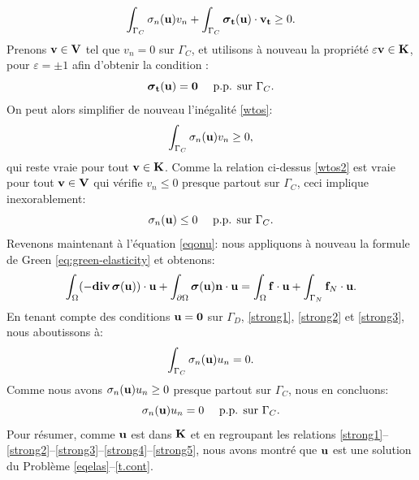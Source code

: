 \documentclass[11pt]{book}
\def\u{{\bf u}}
\def\t{{\bf t}}
\def\n{{\bf n}}
\def\f{{\bf f}}
\def\vv{{\bf v}}
\def\V{{\bf V}}
\def\K{{\bf K}}
\def\0{{\bf 0}}
\newcommand{\dg}{d\Gamma}
\newcommand{\bs}{\mbox{\boldmath{$\sigma$}}}
\begin{document}
 \begin{equation*}
 \int_{\Gamma_C} \sigma_n (\u) v_n %
 +
 \int_{\Gamma_C} \bs_\t (\u) \cdot \vv_\t %
 \geq
 0.
 \end{equation*}
 Prenons $\vv \in \V$ tel que $v_n = 0$ sur $\Gamma_C$, et utilisons à nouveau la propriété $\varepsilon \vv \in \K$, pour $\varepsilon = \pm 1$ %
 afin d'obtenir la condition :
 \begin{equation}\label{strong3}
 \bs_\t(\u) = \0 \quad \textrm{ p.p. sur } \Gamma_C.
 \end{equation}
 On peut alors simplifier de nouveau l'inégalité \eqref{wtos}: %
 \begin{equation}
 \label{wtos2}
 \int_{\Gamma_C} \sigma_n (\u) v_n %
 \geq
 0,
 \end{equation}
qui reste vraie pour tout $\vv \in \K$. 
Comme la relation ci-dessus \eqref{wtos2} est vraie pour tout $\vv \in \V$ qui vérifie $v_n \leq 0$ presque partout sur $\Gamma_C$, ceci implique inexorablement: 
\begin{equation}\label{strong4}
\sigma_n (\u) \leq 0 \quad \textrm{ p.p. sur } \Gamma_C.
\end{equation}
Revenons maintenant à l'équation \eqref{eqonu}:
nous appliquons à nouveau la formule de Green \eqref{eq:green-elasticity} %
et obtenons:
\[
 \displaystyle \int_\Omega (- {\bf div}\, \bs(\u) ) \cdot \u %
 + \int_{\partial \Omega} \bs(\u) \n \cdot \u %
 =
 \displaystyle \int_{\Omega} \f \cdot \u %
 +\int_{\Gamma_N} \f_N \cdot \u. %
\]
En tenant compte des conditions $\u = \0$ sur $\Gamma_D$, \eqref{strong1}, \eqref{strong2} et \eqref{strong3}, nous aboutissons à:
\[
 \int_{\Gamma_C} \sigma_n (\u) u_n %
 = 0.
\]
Comme nous avons $ \sigma_n (\u) u_n  \geq 0$ presque partout sur $\Gamma_C$, nous en concluons:
\begin{equation}\label{strong5}
 \sigma_n (\u) u_n = 0 \quad \textrm{ p.p. sur } \Gamma_C.
\end{equation}
Pour résumer, comme $\u$ est dans $\K$ et en regroupant les relations \eqref{strong1}--\eqref{strong2}--\eqref{strong3}--\eqref{strong4}--\eqref{strong5}, nous avons montré que $\u$ est une solution du Problème \eqref{eqelas}--\eqref{t.cont}. %
\end{document}
